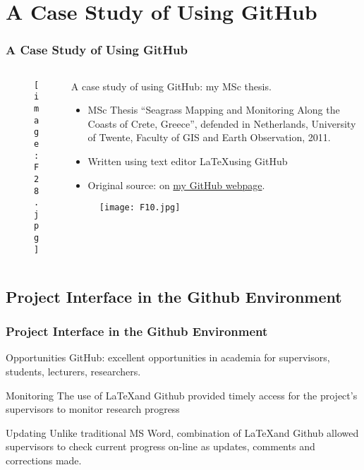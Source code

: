 \documentclass[pdflatex,compress,8pt,
	xcolor={dvipsnames,dvipsnames,svgnames,x11names,table},
	hyperref={
	breaklinks = true, 
	pdfauthor={Lemenkova Polina}, 
	pdfsubject={Preentation}, 
	pdfcreator={Lemenkova Polina}, 
	pdfproducer={Lemenkova Polina}, 
	colorlinks=true,linkcolor=blue, 
	citecolor=NavyBlue, 
	urlcolor = NavyBlue, 
	breaklinks = true}]{beamer}
\begin{document}
\section{A Case Study of Using GitHub}
\begin{frame}\frametitle{ A Case Study of Using GitHub}
\begin{minipage}[0.4\textheight]{\textwidth}
\begin{columns}[T]
\begin{column}{0.5\textwidth}
\vspace{2em}
\begin{figure}[H]
	\centering
		\texttt{[image: F28.jpg]}
\end{figure}
\end{column}
\begin{column}{0.5\textwidth}
\vspace{1em} 
\small{A case study of using GitHub: my MSc thesis. 
\begin{itemize}
	\item MSc Thesis “Seagrass Mapping and Monitoring Along the Coasts of Crete, Greece”, defended in Netherlands, University of Twente, Faculty of GIS and Earth Observation, 2011.
	\item Written using text editor \LaTeX \space using GitHub
	\item Original source: on \href{https://github.com/paulinelemenkova}{my GitHub webpage}.
 \end{itemize}}
 \begin{figure}[H]
	\centering
		\texttt{[image: F10.jpg]}
\end{figure}
\end{column}
\end{columns}
\end{minipage}
\end{frame}

\subsection{Project Interface in the Github Environment}
\begin{frame}\frametitle{Project Interface in the Github Environment}

\begin{alertblock}{Opportunities}
GitHub: excellent opportunities in academia for supervisors, students, lecturers, researchers.
\end{alertblock}

\begin{block}{Monitoring}
The use of \LaTeX \space and Github provided timely access for the project’s supervisors to monitor research progress
\end{block}

\begin{examples}{Updating}
Unlike traditional MS Word, combination of \LaTeX \space and Github allowed supervisors to check current progress on-line as updates, comments and corrections made.
\end{examples}
\end{frame}
\end{document}
